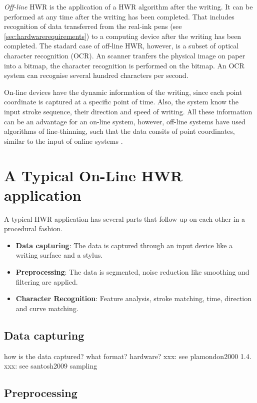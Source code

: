 \emph{Off-line} HWR is the application of a HWR algorithm after the writing.
It can be performed at any time after the writing has been completed. That 
includes recognition of data transferred from the real-ink pens 
(see \ref{sec:hardwarerequirements}) to a computing device after the writing
has been completed. The stadard case of off-line HWR, however, is a subset of
optical character recognition (OCR). An scanner tranfers the physical image 
on paper into a bitmap, the character recognition is performed on the bitmap.
An OCR system can recognise several hundred characters per second.

On-line devices have the dynamic information of the writing, since each point 
coordinate is captured at a specific point of time. Also, the system know the
input stroke sequence, their direction and speed of writing. All these 
information can be an advantage for an on-line system, however, off-line systems
have used algorithms of line-thinning, such that the data consits of point
coordinates, similar to the input of online systems .

\section{A Typical On-Line HWR application}
\label{sec:atypicalonlinehwrapplication}

A typical HWR application has several parts that follow up on each other in a
procedural fashion. 
\begin{itemize}
\item \textbf{Data capturing}: The data is captured through an input device 
  like a writing surface and a stylus.
\item \textbf{Preprocessing}: The data is segmented, noise reduction like smoothing and filtering are applied.
\item \textbf{Character Recognition}: Feature analysis, stroke matching, time, 
direction and curve matching.
\end{itemize}

\subsection{Data capturing}
\label{sec:datacapturing}

how is the data captured? what format?
hardware?
xxx: see plamondon2000 1.4.
xxx: see santosh2009 sampling

\subsection{Preprocessing}
\label{sec:preprocessing}

